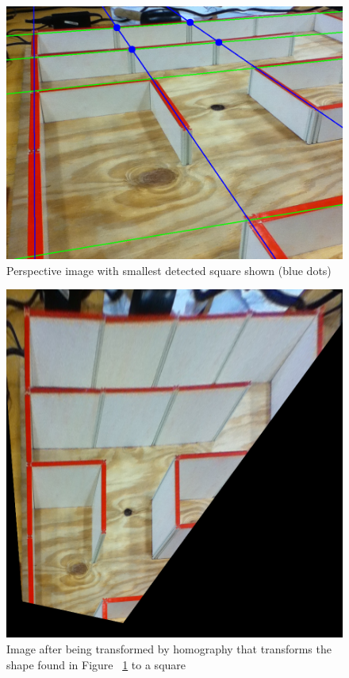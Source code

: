 \documentclass[10pt,twocolumn,letterpaper]{article}
\begin{document}
\begin{figure}[h!]
\begin{center}
		\includegraphics[width=0.8\linewidth]{images/square.png}
\end{center}
\caption{Perspective image with smallest detected square shown (blue dots)}	
\label{fig:square}
\end{figure}

\begin{figure}[h!]
\begin{center}
		\includegraphics[width=0.8\linewidth]{images/ortho.png}
\end{center}
\caption{Image after being transformed by homography that transforms the shape found in Figure ~\ref{fig:square} to a
square}
\label{fig:ortho}
\end{figure}
\end{document}
